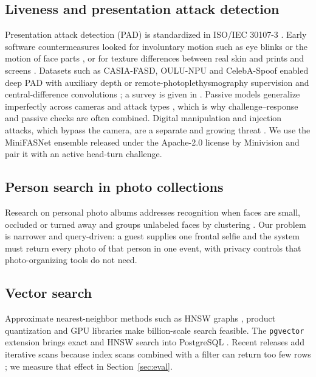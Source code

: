 \documentclass[conference]{IEEEtran}
\begin{document}
\subsection{Liveness and presentation attack detection}
Presentation attack detection (PAD) is standardized in ISO/IEC 30107-3 \cite{iso30107}. Early software countermeasures looked for involuntary motion such as eye blinks \cite{pan2007blink} or the motion of face parts \cite{kollreider2009}, or for texture differences between real skin and prints and screens \cite{chingovska2012,boulkenafet2016}. Datasets such as CASIA-FASD, OULU-NPU and CelebA-Spoof enabled deep PAD with auxiliary depth or remote-photoplethysmography supervision \cite{zhang2012casia,boulkenafet2017oulu,zhang2020celebaspoof,liu2018aux} and central-difference convolutions \cite{yu2020cdcn}; a survey is given in \cite{yu2023survey}. Passive models generalize imperfectly across cameras and attack types \cite{yu2023survey}, which is why challenge--response and passive checks are often combined. Digital manipulation and injection attacks, which bypass the camera, are a separate and growing threat \cite{tolosana2020}. We use the MiniFASNet ensemble released under the Apache-2.0 license by Minivision \cite{minivision} and pair it with an active head-turn challenge.

\subsection{Person search in photo collections}
Research on personal photo albums addresses recognition when faces are small, occluded or turned away \cite{zhang2015piper,oh2015person} and groups unlabeled faces by clustering \cite{wang2019linkage}. Our problem is narrower and query-driven: a guest supplies one frontal selfie and the system must return every photo of that person in one event, with privacy controls that photo-organizing tools do not need.

\subsection{Vector search}
Approximate nearest-neighbor methods such as HNSW graphs \cite{malkov2020hnsw}, product quantization \cite{jegou2011pq} and GPU libraries \cite{johnson2019faiss} make billion-scale search feasible. The \texttt{pgvector} extension brings exact and HNSW search into PostgreSQL \cite{pgvector}. Recent releases add iterative scans because index scans combined with a filter can return too few rows \cite{pgvector08}; we measure that effect in Section~\ref{sec:eval}.
\end{document}
